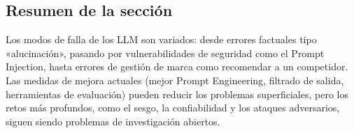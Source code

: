 \subsection{Resumen de la sección}

Los modos de falla de los LLM son variados: desde errores factuales tipo «alucinación», pasando por vulnerabilidades de seguridad como el Prompt Injection, hasta errores de gestión de marca como recomendar a un competidor. Las medidas de mejora actuales (mejor Prompt Engineering, filtrado de salida, herramientas de evaluación) pueden reducir los problemas superficiales, pero los retos más profundos, como el sesgo, la confiabilidad y los ataques adversarios, siguen siendo problemas de investigación abiertos.
